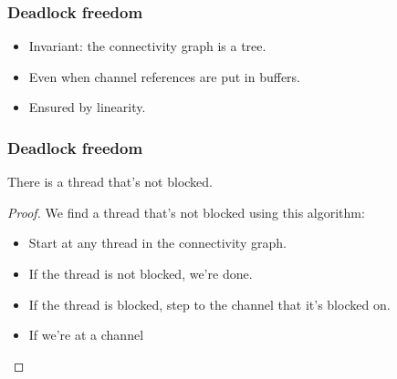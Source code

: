 \documentclass[aspectratio=169]{beamer}
\begin{document}
\begin{frame}[fragile]
  \frametitle{Deadlock freedom}
  \begin{itemize}
    \item Invariant: the connectivity graph is a tree.
    \item Even when channel references are put in buffers.
    \item Ensured by linearity.
  \end{itemize}
\end{frame}

\begin{frame}[fragile]
  \frametitle{Deadlock freedom}
  \begin{theorem}
    There is a thread that's not blocked.
  \end{theorem}
  \begin{proof}
    We find a thread that's not blocked using this algorithm:
    \begin{itemize}
      \item Start at any thread in the connectivity graph.
      \item If the thread is not blocked, we're done.
      \item If the thread is blocked, step to the channel that it's blocked on.
      \item If we're at a channel
    \end{itemize}
  \end{proof}
\end{frame}
\end{document}
